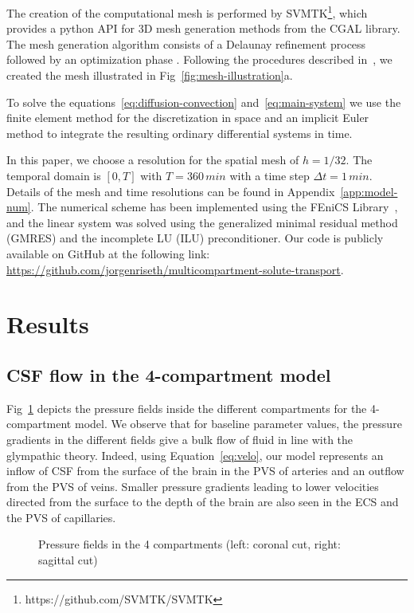 \documentclass[10pt]{article}
\newcommand{\1}{^{(1)}}
\newcommand{\2}{^{(2)}}
\newcommand {\dt}   {\Delta t}
\begin{document}
The creation of the computational mesh is performed by SVMTK\footnote{https://github.com/SVMTK/SVMTK}, which provides a python API for 3D mesh generation methods from the CGAL library. The mesh generation algorithm consists of a Delaunay refinement process followed by an optimization phase \cite{cgal:rty-m3-22a}. Following the procedures described in~\cite{Mardal-2022-mri}, we created the mesh illustrated in Fig~\ref{fig:mesh-illustration}a.

To solve the equations~\eqref{eq:diffusion-convection} and~\eqref{eq:main-system} we use the finite element method for the discretization in space and an implicit Euler method to integrate the resulting ordinary differential systems in time. 

In this paper, we choose a resolution for the spatial mesh of $h=1/32$. The temporal domain is $[0,T]$ with $T=360 \, \si{min}$ with a time step $\dt = 1 \, \si{min}$. Details of the mesh and time resolutions can be found in Appendix~\ref{app:model-num}. The numerical scheme has been implemented using the FEniCS Library~\cite{alnaes2015fenics,LoggMardalEtAl2012}, and the linear system was solved using the generalized minimal residual method (GMRES) and the incomplete LU (ILU) preconditioner. Our code is publicly available on GitHub at the following link: \url{https://github.com/jorgenriseth/multicompartment-solute-transport}.

\section{Results}
\label{sec:results}

\label{sec:application}

\subsection{CSF flow in the 4-compartment model}
Fig~\ref{fig:pressure-Inulin-compartments} depicts the pressure fields inside the different compartments for the 4-compartment model. We observe that for baseline parameter values, the pressure gradients in the different fields give a bulk flow of fluid in line with the glympathic theory. Indeed, using Equation~\eqref{eq:velo}, our model represents an inflow of CSF from the surface of the brain in the PVS of arteries and an outflow from the PVS of veins. Smaller pressure gradients leading to lower velocities directed from the surface to the depth of the brain are also seen in the ECS and the PVS of capillaries. 
\begin{figure}[htbp]
    \centering
    \caption{Pressure fields in the 4 compartments (left: coronal cut, right: sagittal cut)}
    \label{fig:pressure-Inulin-compartments}
\end{figure}
\end{document}
